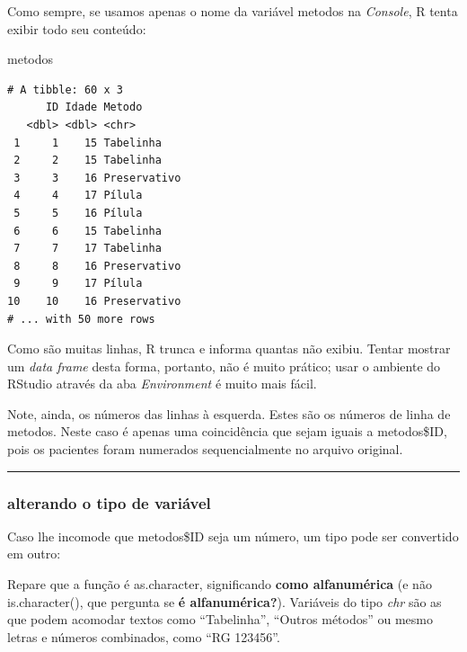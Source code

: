 \documentclass[
]{article}
\newenvironment{Shaded}{\begin{snugshade}}{\end{snugshade}}
\newcommand{\FunctionTok}[1]{\textcolor[rgb]{0.00,0.00,0.00}{#1}}
\newcommand{\NormalTok}[1]{#1}
\newcommand{\OtherTok}[1]{\textcolor[rgb]{0.56,0.35,0.01}{#1}}
\newcommand{\SpecialCharTok}[1]{\textcolor[rgb]{0.00,0.00,0.00}{#1}}
\begin{document}
Como sempre, se usamos apenas o nome da variável metodos na
\emph{Console}, R tenta exibir todo seu conteúdo:

\begin{Shaded}
\begin{Highlighting}[]
\NormalTok{metodos}
\end{Highlighting}
\end{Shaded}

\begin{verbatim}
# A tibble: 60 x 3
      ID Idade Metodo      
   <dbl> <dbl> <chr>       
 1     1    15 Tabelinha   
 2     2    15 Tabelinha   
 3     3    16 Preservativo
 4     4    17 Pílula      
 5     5    16 Pílula      
 6     6    15 Tabelinha   
 7     7    17 Tabelinha   
 8     8    16 Preservativo
 9     9    17 Pílula      
10    10    16 Preservativo
# ... with 50 more rows
\end{verbatim}

Como são muitas linhas, R trunca e informa quantas não exibiu. Tentar
mostrar um \emph{data frame} desta forma, portanto, não é muito prático;
usar o ambiente do RStudio através da aba \emph{Environment} é muito
mais fácil.

Note, ainda, os números das linhas à esquerda. Estes são os números de
linha de metodos. Neste caso é apenas uma coincidência que sejam iguais
a metodos\$ID, pois os pacientes foram numerados sequencialmente no
arquivo original.

\begin{center}\rule{0.5\linewidth}{0.5pt}\end{center}

\hypertarget{alterando-o-tipo-de-variuxe1vel}{%
\subsubsection{alterando o tipo de
variável}\label{alterando-o-tipo-de-variuxe1vel}}

Caso lhe incomode que metodos\$ID seja um número, um tipo pode ser
convertido em outro:

\begin{Shaded}
\end{Shaded}

Repare que a função é as.character, significando \textbf{como
alfanumérica} (e não is.character(), que pergunta se \textbf{é
alfanumérica?}). Variáveis do tipo \emph{chr} são as que podem acomodar
textos como ``Tabelinha'', ``Outros métodos'' ou mesmo letras e números
combinados, como ``RG 123456''.
\end{document}
